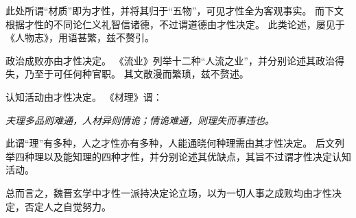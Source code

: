 \documentclass[11pt]{article}
\begin{document}
此处所谓“材质”即为才性，并将其归于“五物”，可见才性全为客观事实。
而下文根据才性的不同论仁义礼智信诸德，不过谓道德由才性决定。
此类论述，屡见于《人物志》，用语甚繁，兹不赘引。

\newline

政治成败亦由才性决定。
《流业》列举十二种“人流之业”，并分别论述其政治得失，乃至于可任何种官职。
其文散漫而繁琐，兹不赘述。

\newline

认知活动由才性决定。
《材理》谓：

\textit{夫理多品则难通，人材异则情诡；情诡难通，则理失而事违也。}

此谓“理”有多种，人之才性亦有多种，人能通晓何种理需由其才性决定。
后文列举四种理以及能知理的四种才性，并分别论述其优缺点，其旨不过谓才性决定认知活动。

\newline

总而言之，魏晋玄学中才性一派持决定论立场，以为一切人事之成败均由才性决定，否定人之自觉努力。
\end{document}
